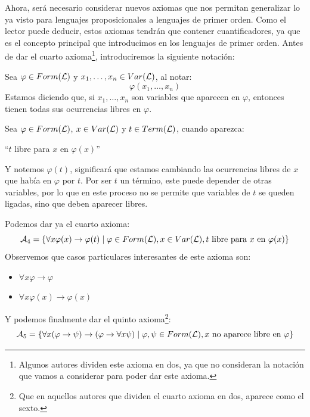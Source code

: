Ahora, será necesario considerar nuevos axiomas que nos permitan generalizar lo ya visto para lenguajes proposicionales a lenguajes de primer orden. Como el lector puede deducir, estos axiomas tendrán que contener cuantificadores, ya que es el concepto principal que introducimos en los lenguajes de primer orden. Antes de dar el cuarto axioma\footnote{Algunos autores dividen este axioma en dos, ya que no consideran la notación que vamos a considerar para poder dar este axioma.}, introduciremos la siguiente notación:

\begin{notacion}
    Sea $\varphi \in Form(\mathcal{L})$ y $x_1,\ldots,x_n \in Var(\mathcal{L})$, al notar:
    \begin{equation*}
        \varphi(x_1,\ldots,x_n)
    \end{equation*}
    Estamos diciendo que, si $x_1,\ldots,x_n$ son variables que aparecen en $\varphi$, entonces tienen todas sus ocurrencias libres en $\varphi$.
\end{notacion}

\begin{notacion}
    Sea $\varphi \in Form(\mathcal{L})$, $x\in Var(\mathcal{L})$ y $t\in Term(\mathcal{L})$, cuando aparezca:
    \begin{center}
        ``$t$ libre para $x$ en $\varphi(x)$''
    \end{center}
    Y notemos $\varphi(t)$, significará que estamos cambiando las ocurrencias libres de $x$ que había en $\varphi$ por $t$. Por ser $t$ un término, este puede depender de otras variables, por lo que en este proceso no se permite que variables de $t$ se queden ligadas, sino que deben aparecer libres.
\end{notacion}
Podemos dar ya el cuarto axioma:
\begin{equation*}
    \mathcal{A}_4 = \{\forall x\varphi(x)\to\varphi(t) \mid \varphi \in Form(\mathcal{L}), x\in Var(\mathcal{L}), t \text{\ libre para\ } x \text{\ en\ } \varphi(x)\}
\end{equation*}
Observemos que casos particulares interesantes de este axioma son:
\begin{itemize}
    \item $\forall x\varphi \to \varphi$
    \item $\forall x\varphi(x)\to \varphi(x)$
\end{itemize}

Y podemos finalmente dar el quinto axioma\footnote{Que en aquellos autores que dividen el cuarto axioma en dos, aparece como el sexto.}:
\begin{equation*}
    \mathcal{A}_5 = \{\forall x(\varphi\to\psi)\to(\varphi\to\forall x\psi) \mid \varphi,\psi \in Form(\mathcal{L}), x \text{\ no aparece libre en\ } \varphi\}
\end{equation*}

